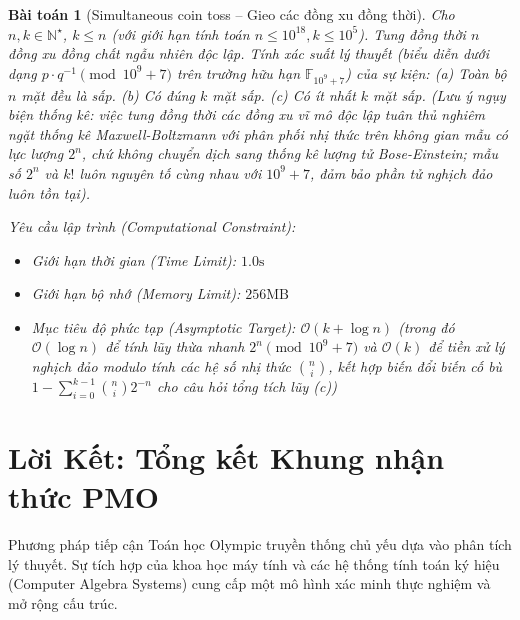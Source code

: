 \documentclass{article}
\newtheorem{baitoan}{Bài toán}
\begin{document}
\begin{baitoan}[Simultaneous coin toss -- Gieo các đồng xu đồng thời]
	Cho $n,k\in\mathbb{N}^\star$, $k\le n$ (với giới hạn tính toán $n \le 10^{18}, k \le 10^5$). Tung đồng thời $n$ đồng xu đồng chất ngẫu nhiên độc lập. Tính xác suất lý thuyết (biểu diễn dưới dạng $p \cdot q^{-1} \pmod{10^9+7}$ trên trường hữu hạn $\mathbb{F}_{10^9+7}$) của sự kiện: (a) Toàn bộ $n$ mặt đều là sấp. (b) Có đúng $k$ mặt sấp. (c) Có ít nhất $k$ mặt sấp. (Lưu ý ngụy biện thống kê: việc tung đồng thời các đồng xu vĩ mô độc lập tuân thủ nghiêm ngặt thống kê Maxwell-Boltzmann với phân phối nhị thức trên không gian mẫu có lực lượng $2^n$, chứ không chuyển dịch sang thống kê lượng tử Bose-Einstein; mẫu số $2^n$ và $k!$ luôn nguyên tố cùng nhau với $10^9+7$, đảm bảo phần tử nghịch đảo luôn tồn tại).

    \vspace{0.5em}
    \emph{Yêu cầu lập trình (Computational Constraint):}
    \begin{itemize}
        \item Giới hạn thời gian (Time Limit): $1.0\mathrm{s}$
        \item Giới hạn bộ nhớ (Memory Limit): $256\mathrm{MB}$
        \item Mục tiêu độ phức tạp (Asymptotic Target): $\mathcal{O}(k + \log n)$ (trong đó $\mathcal{O}(\log n)$ để tính lũy thừa nhanh $2^n \pmod{10^9+7}$ và $\mathcal{O}(k)$ để tiền xử lý nghịch đảo modulo tính các hệ số nhị thức $\binom{n}{i}$, kết hợp biến đổi biến cố bù $1 - \sum_{i=0}^{k-1} \binom{n}{i} 2^{-n}$ cho câu hỏi tổng tích lũy (c))
    \end{itemize}
\end{baitoan}


\section*{Lời Kết: Tổng kết Khung nhận thức PMO}

Phương pháp tiếp cận Toán học Olympic truyền thống chủ yếu dựa vào phân tích lý thuyết. Sự tích hợp của khoa học máy tính và các hệ thống tính toán ký hiệu (Computer Algebra Systems) cung cấp một mô hình xác minh thực nghiệm và mở rộng cấu trúc.
\end{document}
